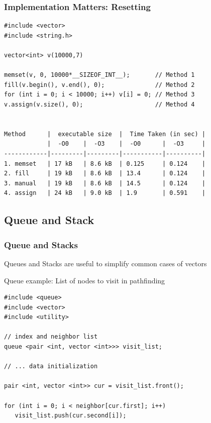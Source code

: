\documentclass{beamer}
\begin{document}
\begin{frame}[fragile]
  \frametitle{Implementation Matters: Resetting}
{\small
\begin{verbatim}
#include <vector>
#include <string.h>

vector<int> v(10000,7)

memset(v, 0, 10000*__SIZEOF_INT__);       // Method 1
fill(v.begin(), v.end(), 0);              // Method 2
for (int i = 0; i < 10000; i++) v[i] = 0; // Method 3
v.assign(v.size(), 0);                    // Method 4


Method      |  executable size  |  Time Taken (in sec) |
            |  -O0    |  -O3    |  -O0      |  -O3     |  
------------|---------|---------|-----------|----------|
1. memset   | 17 kB   | 8.6 kB  | 0.125     | 0.124    |
2. fill     | 19 kB   | 8.6 kB  | 13.4      | 0.124    |
3. manual   | 19 kB   | 8.6 kB  | 14.5      | 0.124    |
4. assign   | 24 kB   | 9.0 kB  | 1.9       | 0.591    |
\end{verbatim}
}
\end{frame}
  

\subsection{Queue and Stack}

\begin{frame}[fragile]
  \frametitle{Queue and Stacks}

  \begin{block}{}
    Queues and Stacks are useful to simplify common cases of vectors
  \end{block}

  Queue example: List of nodes to visit in pathfinding
{\small
\begin{verbatim}
#include <queue>
#include <vector>
#include <utility>

// index and neighbor list
queue <pair <int, vector <int>>> visit_list;

// ... data initialization

pair <int, vector <int>> cur = visit_list.front();

for (int i = 0; i < neighbor[cur.first]; i++)
   visit_list.push(cur.second[i]);
\end{verbatim}
}
  
\end{frame}
\end{document}
